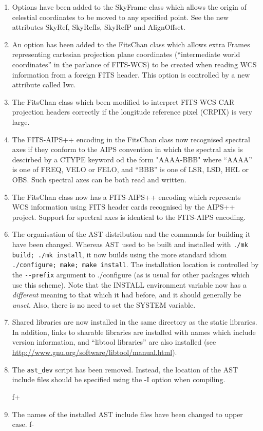 \documentclass[twoside,11pt]{starlink}
\begin{document}
\begin{enumerate}

\item Options have been added to the SkyFrame class which allows the
origin
of celestial coordinates to be moved to any specified point. See the new
attributes SkyRef, SkyRefIs, SkyRefP and AlignOffset.

\item An option has been added to the FitsChan class which allows extra
Frames representing cartesian projection plane coordinates (``intermediate
world coordinates'' in the parlance of FITS-WCS) to be created when
reading
WCS information from a foreign FITS header. This option is controlled by
a new attribute called Iwc.

\item The FitsChan class which been modified to interpret FITS-WCS CAR
projection headers correctly if the longitude reference pixel (CRPIX) is
very large.

\item The  FITS-AIPS++ encoding in the FitsChan class now recognised
spectral axes if they conform to the AIPS convention in which the
spectral axis is descirbed by a CTYPE keyword od the form "AAAA-BBB"
where ``AAAA'' is one of FREQ, VELO or FELO, and ``BBB'' is one of LSR, LSD,
HEL or OBS. Such spectral axes can be both read and written.

\item The FitsChan class now has a FITS-AIPS++ encoding which represents
WCS information using FITS header cards recognised by the AIPS++ project.
Support for spectral axes is identical to the FITS-AIPS encoding.

\item The organisation of the AST distribution and the commands for
building it have been changed. Whereas AST used to be built and installed
with \verb+./mk build; ./mk install+, it now builds using the more standard
idiom \verb+./configure; make; make install+. The installation location is
controlled by the \verb+--prefix+ argument to ./configure (as is usual
for other packages which use this scheme).  Note that the INSTALL environment
variable now has a \emph{different} meaning to that which it had
before, and it should generally be \emph{unset}. Also, there is no need to
set the SYSTEM variable.

\item Shared libraries are now installed in the same directory as the
static libraries. In addition, links to sharable libraries are installed
with names which include version information, and ``libtool libraries''
are also installed (see
\url{http://www.gnu.org/software/libtool/manual.html}).

\item The \verb+ast_dev+ script has been removed. Instead, the location of
the AST include files should be specified using the -I option when
compiling.

f+
\item The names of the installed AST include files have been changed to
upper case.
f-

\end{enumerate}
\end{document}
